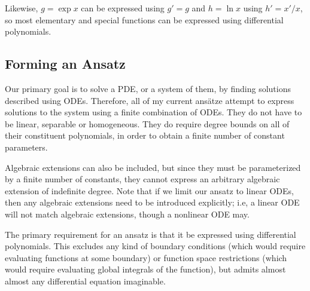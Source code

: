 \documentclass{article}
\theoremstyle{definition}
\theoremstyle{plain}
\begin{document}

Likewise, $g=\exp x$ can be expressed using $g' = g$ and $h=\ln x$ using $h' = x'/x$,
so most elementary and special functions can be expressed using
differential polynomials.

\subsection{Forming an Ansatz}

Our primary goal is to solve a PDE, or a system of them, by finding solutions described using ODEs.
Therefore, all of my current ans\"atze attempt to express solutions to the system using
a finite combination of ODEs.  They do not have to be linear, separable or homogeneous.
They do require degree bounds on all of their constituent polynomials,
in order to obtain a finite number of constant parameters.

Algebraic extensions can also be included, but since
they must be parameterized by a finite number of constants, they cannot express
an arbitrary algebraic extension of indefinite degree.
Note that if we limit our ansatz to linear ODEs, then any algebraic extensions need
to be introduced explicitly; i.e, a linear ODE will not match algebraic extensions,
though a nonlinear ODE may.

The primary requirement for an ansatz is that it be expressed using differential polynomials.
This excludes any kind of boundary conditions (which would require evaluating functions at some boundary)
or function space restrictions (which would require evaluating global integrals of the function),
but admits almost almost any differential equation imaginable.
\end{document}
